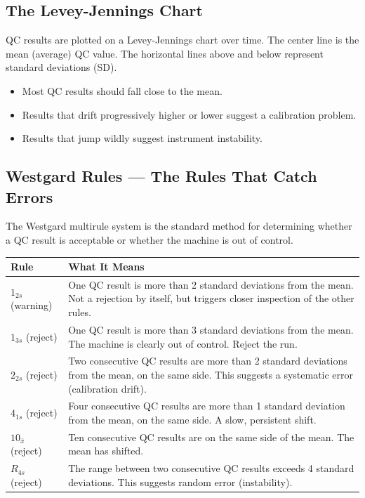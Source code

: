 \subsection{The Levey-Jennings Chart}

QC results are plotted on a Levey-Jennings chart over time. The center line is the mean (average) QC value. The horizontal lines above and below represent standard deviations (SD).

\begin{itemize}
    \item Most QC results should fall close to the mean.
    \item Results that drift progressively higher or lower suggest a calibration problem.
    \item Results that jump wildly suggest instrument instability.
\end{itemize}

\subsection{Westgard Rules --- The Rules That Catch Errors}

The Westgard multirule system is the standard method for determining whether a QC result is acceptable or whether the machine is out of control.

\begin{longtable}{@{}ll@{}}
\toprule
\textbf{Rule} & \textbf{What It Means} \\
\midrule
$1_{2s}$ (warning) & One QC result is more than 2 standard deviations from the mean. Not a rejection by itself, but triggers closer inspection of the other rules. \\
$1_{3s}$ (reject) & One QC result is more than 3 standard deviations from the mean. The machine is clearly out of control. Reject the run. \\
$2_{2s}$ (reject) & Two consecutive QC results are more than 2 standard deviations from the mean, on the same side. This suggests a systematic error (calibration drift). \\
$4_{1s}$ (reject) & Four consecutive QC results are more than 1 standard deviation from the mean, on the same side. A slow, persistent shift. \\
$10_{\bar{x}}$ (reject) & Ten consecutive QC results are on the same side of the mean. The mean has shifted. \\
$R_{4s}$ (reject) & The range between two consecutive QC results exceeds 4 standard deviations. This suggests random error (instability). \\
\bottomrule
\end{longtable}

